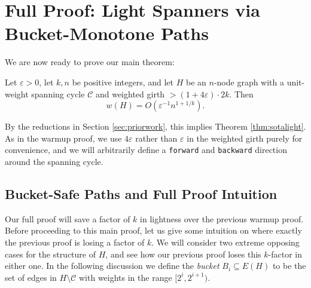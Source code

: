 \documentclass{theoretics}
\newcommand{\eps}{\varepsilon}
\newcommand{\cee}{\mathcal{C}}
\newcommand{\forward}{\texttt{forward}}
\newcommand{\backward}{\texttt{backward}}
\begin{document}


\section{Full Proof: Light Spanners via Bucket-Monotone Paths \label{sec:mainproof}}

We are now ready to prove our main theorem:

\begin{theorem}  \label{thm:main}
Let $\eps>0$, let $k, n$ be positive integers, and let $H$ be an $n$-node graph with a unit-weight spanning cycle $\cee$ and weighted girth $>(1+4 \eps) \cdot 2k$.
Then
$$w(H) = O\left( \eps^{-1} n^{1+1/k} \right).$$
\end{theorem}

By the reductions in Section \ref{sec:priorwork}, this implies Theorem \ref{thm:sotalight}.
As in the warmup proof, we use $4\eps$ rather than $\eps$ in the weighted girth purely for convenience, and we will arbitrarily define a \forward{} and \backward{} direction around the spanning cycle.

\subsection{Bucket-Safe Paths and Full Proof Intuition}

Our full proof will save a factor of $k$ in lightness over the previous warmup proof.
Before proceeding to this main proof, let us give some intuition on where exactly the previous proof is losing a factor of $k$.
We will consider two extreme opposing cases for the structure of $H$, and see how our previous proof loses this $k$-factor in either one.
In the following discussion we define the \emph{bucket} $B_i \subseteq E(H)$ to be the set of edges in $H \setminus \cee$ with weights in the range $[2^i, 2^{i+1})$.
\end{document}
